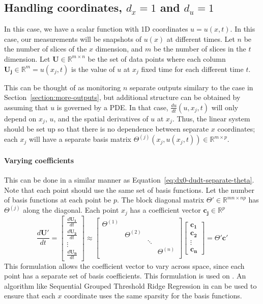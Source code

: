 \documentclass{article}
\let\vec\mathbf
\def\real{\mathbb{R}}
\begin{document}
\subsection{Handling coordinates, $d_x = 1$ and $d_u = 1$}
In this case, we have a scalar function with 1D coordinates $u = u(x,t)$. In
this case, our measurements will be snapshots of $u(x)$ at different times. Let
$n$ be the number of slices of the $x$ dimension, and $m$ be the number of
slices in the $t$ dimension. Let $\vec{U} \in \real^{m \times n}$ be the set of
data points where each column $\vec{U_j} \in \real^m = u(x_j, t)$ is the value
of $u$ at $x_j$ fixed time for each different time $t$.

This can be thought of as monitoring $n$ separate outputs similary to the case
in Section~\ref{section:more-outputs}, but additional structure can be obtained by
assuming that $u$ is governed by a PDE. In that case, $\frac{du}{dt}(u,x_j,t)$
will only depend on $x_j$, $u$, and the spatial derivatives of $u$ at $x_j$.
Thus, the linear system should be set up so that there is no dependence between
separate $x$ coordinates; each $x_j$ will have a separate basis matrix
$\Theta^{(j)}(x_j, u(x_j,t)) \in \real^{m \times p}$.

\paragraph{Varying coefficients}
This can be done in a similar manner as
Equation~\ref{eq:dx0-dudt-separate-theta}. Note that each point should use the
same set of basis functions. Let the number of basis functions at each point be
$p$. The block diagonal matrix $\Theta' \in \real^{mn \times np}$ has
$\Theta^{(j)}$ along the diagonal. Each point $x_j$ has a coefficient vector
$\vec{c_j} \in \real^p$
\begin{equation}\label{eq:coord-varying}
\frac{d\vec{U'}}{dt} = 
\begin{bmatrix}
\frac{d\vec{U_1}}{dt} \\ \frac{d\vec{U_2}}{dt} \\ \vdots \\ \frac{d\vec{U_n}}{dt}
\end{bmatrix}
\approx
\begin{bmatrix}
\Theta^{(1)} \\
& \Theta^{(2)} \\
& & \ddots \\
& & & \Theta^{(n)} \\
\end{bmatrix}
\begin{bmatrix}
\vec{c_1} \\ \vec{c_2} \\ \vdots \\ \vec{c_{n}}
\end{bmatrix}
= \Theta' \vec{c}'
\end{equation}
This formulation allows the coefficient vector to vary across space, since each
point has a separate set of basis coefficients. This formulation is used on
\cite{shea2020sindy-bvp}. An algorithm like Sequential Grouped Threshold Ridge
Regression in \cite{shea2020sindy-bvp} can be used to ensure that each $x$
coordinate uses the same sparsity for the basis functions.
\end{document}
